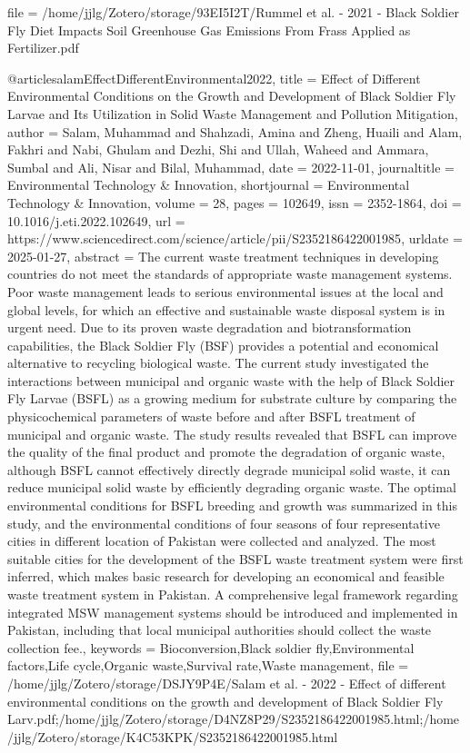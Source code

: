 {{{{{  file = {/home/jjlg/Zotero/storage/93EI5I2T/Rummel et al. - 2021 - Black Soldier Fly Diet Impacts Soil Greenhouse Gas Emissions From Frass Applied as Fertilizer.pdf}
}

@article{salamEffectDifferentEnvironmental2022,
  title = {Effect of Different Environmental Conditions on the Growth and Development of {{Black Soldier Fly Larvae}} and Its Utilization in Solid Waste Management and Pollution Mitigation},
  author = {Salam, Muhammad and Shahzadi, Amina and Zheng, Huaili and Alam, Fakhri and Nabi, Ghulam and Dezhi, Shi and Ullah, Waheed and Ammara, Sumbal and Ali, Nisar and Bilal, Muhammad},
  date = {2022-11-01},
  journaltitle = {Environmental Technology \& Innovation},
  shortjournal = {Environmental Technology \& Innovation},
  volume = {28},
  pages = {102649},
  issn = {2352-1864},
  doi = {10.1016/j.eti.2022.102649},
  url = {https://www.sciencedirect.com/science/article/pii/S2352186422001985},
  urldate = {2025-01-27},
  abstract = {The current waste treatment techniques in developing countries do not meet the standards of appropriate waste management systems. Poor waste management leads to serious environmental issues at the local and global levels, for which an effective and sustainable waste disposal system is in urgent need. Due to its proven waste degradation and biotransformation capabilities, the Black Soldier Fly (BSF) provides a potential and economical alternative to recycling biological waste. The current study investigated the interactions between municipal and organic waste with the help of Black Soldier Fly Larvae (BSFL) as a growing medium for substrate culture by comparing the physicochemical parameters of waste before and after BSFL treatment of municipal and organic waste. The study results revealed that BSFL can improve the quality of the final product and promote the degradation of organic waste, although BSFL cannot effectively directly degrade municipal solid waste, it can reduce municipal solid waste by efficiently degrading organic waste. The optimal environmental conditions for BSFL breeding and growth was summarized in this study, and the environmental conditions of four seasons of four representative cities in different location of Pakistan were collected and analyzed. The most suitable cities for the development of the BSFL waste treatment system were first inferred, which makes basic research for developing an economical and feasible waste treatment system in Pakistan. A comprehensive legal framework regarding integrated MSW management systems should be introduced and implemented in Pakistan, including that local municipal authorities should collect the waste collection fee.},
  keywords = {Bioconversion,Black soldier fly,Environmental factors,Life cycle,Organic waste,Survival rate,Waste management},
  file = {/home/jjlg/Zotero/storage/DSJY9P4E/Salam et al. - 2022 - Effect of different environmental conditions on the growth and development of Black Soldier Fly Larv.pdf;/home/jjlg/Zotero/storage/D4NZ8P29/S2352186422001985.html;/home/jjlg/Zotero/storage/K4C53KPK/S2352186422001985.html}
}

}}}}
